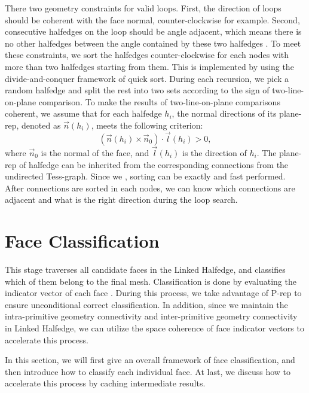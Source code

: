\documentclass[10pt,journal,compsoc]{IEEEtran}
\begin{document}
There two geometry constraints for valid loops. First, the direction of loops should be coherent with the face normal, counter-clockwise for example. Second, consecutive halfedges on the loop should be angle adjacent, which means there is no other halfedges between the angle contained by these two halfedges {\color{red}{Fig.?}}. To meet these constraints, we sort the halfedges counter-clockwise for each nodes with more than two halfedges starting from them. This is implemented by using the divide-and-conquer framework of quick sort. During each recursion, we pick a random halfedge and split the rest into two sets according to the sign of two-line-on-plane comparison. To make the results of two-line-on-plane comparisons coherent, we assume that for each halfedge $h_i$, the normal directions of its plane-rep, denoted as $\vec{n}(h_i)$, meets the following criterion:
\begin{equation}
(\vec{n}(h_i) \times \vec{n}_0) \cdot \vec{l}(h_i) > 0,
\end{equation}
where $\vec{n}_0$ is the normal of the face, and $\vec{l}(h_i)$ is the direction of $h_i$. The plane-rep of halfedge can be inherited from the corresponding connections from the undirected Tess-graph. Since we {\color{red}{guarantee that each connection has a plane-rep //need insert//}}, sorting can be exactly and fast performed. After connections are sorted in each nodes, we can know which connections are adjacent and what is the right direction during the loop search.


\section{Face Classification}

\label{sec:classification}
This stage traverses all candidate faces in the Linked Halfedge, and classifies which of them belong to the final mesh. Classification is done by evaluating the indicator vector of each face {\color{red}{(indicator vector?)}}. During this process, we take advantage of P-rep to ensure unconditional correct classification. In addition, since we maintain the intra-primitive geometry connectivity and inter-primitive geometry connectivity in Linked Halfedge, we can utilize the space coherence of face indicator vectors to accelerate this process.

In this section, we will first give an overall framework of face classification, and then introduce how to classify each individual face. At last, we discuss how to accelerate this process by caching intermediate results.
\end{document}
